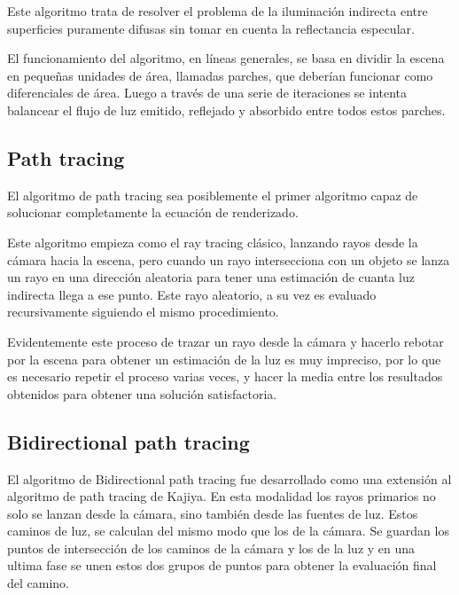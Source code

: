 \medskip

Este algoritmo trata de resolver el problema de la iluminación indirecta entre superficies puramente difusas sin tomar en cuenta la reflectancia especular.

\medskip

El funcionamiento del algoritmo, en líneas generales, se basa en dividir la escena en pequeñas unidades de área, llamadas parches, que deberían funcionar como diferenciales de área. Luego a través de una serie de iteraciones se intenta balancear el flujo de luz emitido, reflejado y absorbido entre todos estos parches.

\clearpage

\subsection{Path tracing}

El algoritmo de path tracing \cite{Kajiya1986} sea posiblemente el primer algoritmo capaz de solucionar completamente la ecuación de renderizado.

\medskip

Este algoritmo empieza como el ray tracing clásico, lanzando rayos desde la cámara hacia la escena, pero cuando un rayo intersecciona con un objeto se lanza un rayo en una dirección aleatoria para tener una estimación de cuanta luz indirecta llega a ese punto. Este rayo aleatorio, a su vez es evaluado recursivamente siguiendo el mismo procedimiento. 

\medskip 

Evidentemente este proceso de trazar un rayo desde la cámara y hacerlo rebotar por la escena para obtener un estimación de la luz es muy impreciso, por lo que es necesario repetir el proceso varias veces, y hacer la media entre los resultados obtenidos para obtener una solución satisfactoria. 

\subsection{Bidirectional path tracing}

El algoritmo de Bidirectional path tracing \cite{Lafortune1993} fue desarrollado como una extensión al algoritmo de path tracing de Kajiya. En esta modalidad los rayos primarios no solo se lanzan desde la cámara, sino también desde las fuentes de luz. Estos caminos de luz, se calculan del mismo modo que los de la cámara. Se guardan los puntos de intersección de los caminos de la cámara y los de la luz y en una ultima fase se unen estos dos grupos de puntos para obtener la evaluación final del camino.

